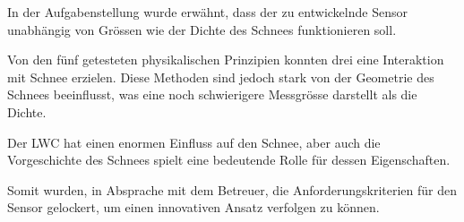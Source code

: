 In der Aufgabenstellung wurde erwähnt, dass der zu entwickelnde Sensor unabhängig von Grössen wie der Dichte des Schnees funktionieren soll.

Von den fünf getesteten physikalischen Prinzipien konnten drei eine Interaktion mit Schnee erzielen. Diese Methoden sind jedoch stark von der Geometrie des Schnees beeinflusst, was eine noch schwierigere Messgrösse darstellt als die Dichte.

Der LWC hat einen enormen Einfluss auf den Schnee, aber auch die Vorgeschichte des Schnees spielt eine bedeutende Rolle für dessen Eigenschaften.

Somit wurden, in Absprache mit dem Betreuer, die Anforderungskriterien für den Sensor gelockert, um einen innovativen Ansatz verfolgen zu können.
